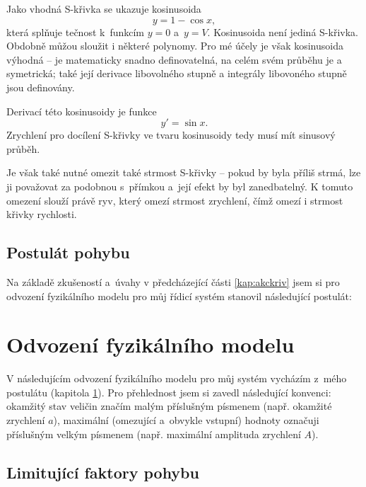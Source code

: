 	Jako vhodná S-křivka se ukazuje kosinusoida
	\begin{equation}
		y=1-\cos x,
	\end{equation}
	která splňuje tečnost k~funkcím $y=0$ a~$y=V$. Kosinusoida není jediná S-křivka. Obdobně můžou sloužit i některé polynomy. Pro mé účely je však kosinusoida výhodná -- je matematicky snadno definovatelná, na celém svém průběhu je  a symetrická; také její derivace libovolného stupně a integrály libovoného stupně jsou definovány.
	
	Derivací této kosinusoidy je funkce
	\begin{equation}
		y' = \sin x.
	\end{equation}
	Zrychlení pro docílení S-křivky ve tvaru kosinusoidy tedy musí mít sinusový průběh.
	
	Je však také nutné omezit také strmost S-křivky -- pokud by byla příliš strmá, lze ji považovat za podobnou s~přímkou a~její efekt by byl zanedbatelný. K tomuto omezení slouží právě ryv, který omezí strmost zrychlení, čímž omezí i strmost křivky rychlosti.
	
	\section{Postulát pohybu}\label{kap:postulat}
	
	Na základě zkušeností a~úvahy v předcházející části \ref{kap:akckriv} jsem si pro odvození fyzikálního modelu pro můj řídicí systém stanovil následující postulát:
	


\chapter{Odvození fyzikálního modelu}

	V následujícím odvození fyzikálního modelu pro můj systém vycházím z~mého postulátu (kapitola \ref{kap:postulat}). Pro přehlednost jsem si zavedl následující konvenci: okamžitý stav veličin značím malým příslušným písmenem (např. okamžité zrychlení $a$), maximální (omezující a~obvykle vstupní) hodnoty označuji příslušným velkým písmenem (např. maximální amplituda zrychlení $A$).

	\section{Limitující faktory pohybu}\label{kap:limitujicifaktory}
	
